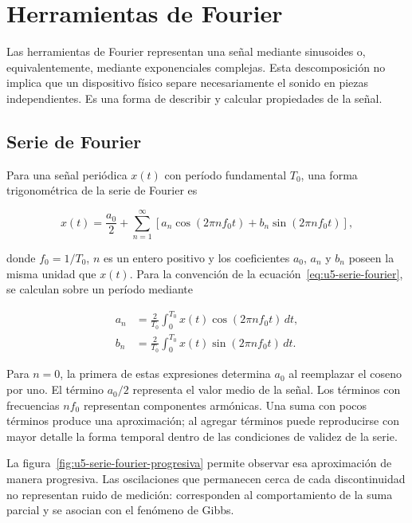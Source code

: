 \section{Herramientas de Fourier}
\label{sec:u5-fourier}

Las herramientas de Fourier representan una señal mediante sinusoides o,
equivalentemente, mediante exponenciales complejas. Esta descomposición no
implica que un dispositivo físico separe necesariamente el sonido en piezas
independientes. Es una forma de describir y calcular propiedades de la señal.

\subsection{Serie de Fourier}
\label{sec:u5-serie-fourier}

Para una señal periódica \(x(t)\) con período fundamental \(T_0\), una forma
trigonométrica de la serie de Fourier es

\begin{equation}
    x(t)=\frac{a_0}{2}
    +\sum_{n=1}^{\infty}
    \left[
        a_n\cos(2\pi n f_0t)
        +b_n\sin(2\pi n f_0t)
    \right],
    \label{eq:u5-serie-fourier}
\end{equation}

donde \(f_0=1/T_0\), \(n\) es un entero positivo y los coeficientes
\(a_0\), \(a_n\) y \(b_n\) poseen la misma unidad que \(x(t)\). Para la
convención de la ecuación~\eqref{eq:u5-serie-fourier}, se calculan sobre un
período mediante

\begin{align}
    a_n&=\frac{2}{T_0}\int_{0}^{T_0}
        x(t)\cos(2\pi n f_0t)\,dt,
        \label{eq:u5-coef-an}\\
    b_n&=\frac{2}{T_0}\int_{0}^{T_0}
        x(t)\sin(2\pi n f_0t)\,dt.
        \label{eq:u5-coef-bn}
\end{align}

Para \(n=0\), la primera de estas expresiones determina \(a_0\) al reemplazar
el coseno por uno. El término \(a_0/2\) representa el valor medio de la señal.
Los términos con frecuencias \(nf_0\) representan componentes armónicas. Una
suma con pocos términos produce una aproximación; al agregar términos puede
reproducirse con mayor detalle la forma temporal dentro de las condiciones de
validez de la serie.

La figura~\ref{fig:u5-serie-fourier-progresiva} permite observar esa
aproximación de manera progresiva. Las oscilaciones que permanecen cerca de cada
discontinuidad no representan ruido de medición: corresponden al comportamiento
de la suma parcial y se asocian con el fenómeno de Gibbs.

